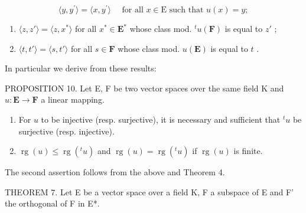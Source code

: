 \[
\langle y, y ^ {\prime} \rangle = \langle x, y ^ {\prime} \rangle \quad \text { for   all } x \in \mathrm{E} \text { such   that } u (x) = y;\tag{16}
\]

\begin{enumerate}
\def\labelenumi{(\arabic{enumi})}
\setcounter{enumi}{16}
\item
  \(\langle z, z' \rangle = \langle z, x^* \rangle\) for all \(x^* \in \mathbf{E}^*\) whose class mod. \(^t u(\mathbf{F})\) is equal to \(z'\) ;
\item
  \(\langle t, t' \rangle = \langle s, t' \rangle\) for all \(s \in \mathbf{F}\) whose class mod. \(u(\mathbf{E})\) is equal to \(t\) .
\end{enumerate}

In particular we derive from these results:

PROPOSITION 10. Let E, F be two vector spaces over the same field K and \(u: \mathbf{E} \to \mathbf{F}\) a linear mapping.

\begin{enumerate}
\def\labelenumi{(\roman{enumi})}
\item
  For \(u\) to be injective (resp. surjective), it is necessary and sufficient that \(^{t}u\) be surjective (resp. injective).
\item
  \(\operatorname{rg}(u) \leqslant \operatorname{rg}(^t u)\) and \(\operatorname{rg}(u) = \operatorname{rg}(^t u)\) if \(\operatorname{rg}(u)\) is finite.
\end{enumerate}

The second assertion follows from the above and Theorem 4.

THEOREM 7. Let E be a vector space over a field K, F a subspace of E and F' the orthogonal of F in E*.

